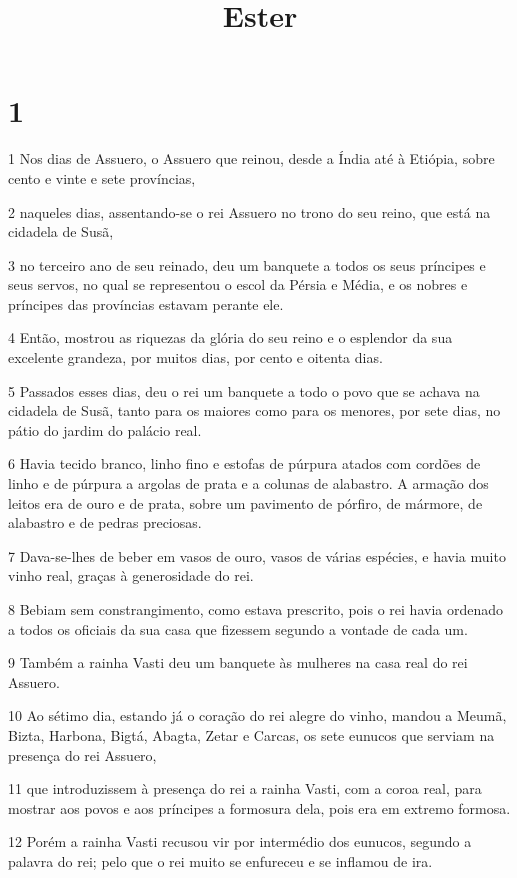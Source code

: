 

\title{Ester}


\chapter{1}

\par 1 Nos dias de Assuero, o Assuero que reinou, desde a Índia até à Etiópia, sobre cento e vinte e sete províncias,
\par 2 naqueles dias, assentando-se o rei Assuero no trono do seu reino, que está na cidadela de Susã,
\par 3 no terceiro ano de seu reinado, deu um banquete a todos os seus príncipes e seus servos, no qual se representou o escol da Pérsia e Média, e os nobres e príncipes das províncias estavam perante ele.
\par 4 Então, mostrou as riquezas da glória do seu reino e o esplendor da sua excelente grandeza, por muitos dias, por cento e oitenta dias.
\par 5 Passados esses dias, deu o rei um banquete a todo o povo que se achava na cidadela de Susã, tanto para os maiores como para os menores, por sete dias, no pátio do jardim do palácio real.
\par 6 Havia tecido branco, linho fino e estofas de púrpura atados com cordões de linho e de púrpura a argolas de prata e a colunas de alabastro. A armação dos leitos era de ouro e de prata, sobre um pavimento de pórfiro, de mármore, de alabastro e de pedras preciosas.
\par 7 Dava-se-lhes de beber em vasos de ouro, vasos de várias espécies, e havia muito vinho real, graças à generosidade do rei.
\par 8 Bebiam sem constrangimento, como estava prescrito, pois o rei havia ordenado a todos os oficiais da sua casa que fizessem segundo a vontade de cada um.
\par 9 Também a rainha Vasti deu um banquete às mulheres na casa real do rei Assuero.
\par 10 Ao sétimo dia, estando já o coração do rei alegre do vinho, mandou a Meumã, Bizta, Harbona, Bigtá, Abagta, Zetar e Carcas, os sete eunucos que serviam na presença do rei Assuero,
\par 11 que introduzissem à presença do rei a rainha Vasti, com a coroa real, para mostrar aos povos e aos príncipes a formosura dela, pois era em extremo formosa.
\par 12 Porém a rainha Vasti recusou vir por intermédio dos eunucos, segundo a palavra do rei; pelo que o rei muito se enfureceu e se inflamou de ira.
